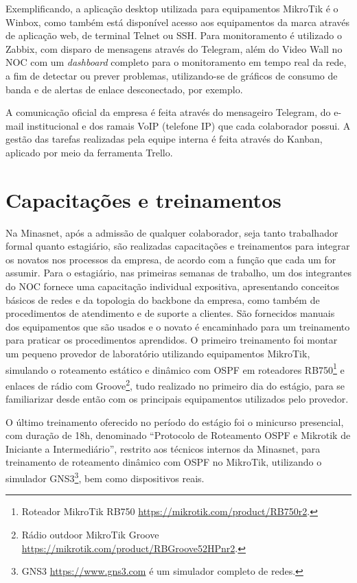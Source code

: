     Exemplificando, a aplicação desktop utilizada para equipamentos MikroTik é o Winbox, como também está disponível acesso aos equipamentos da marca através de aplicação web, de terminal Telnet ou SSH. Para monitoramento é utilizado o Zabbix, com disparo de mensagens através do Telegram, além do Video Wall no NOC com um \textit{dashboard} completo para o monitoramento em tempo real da rede, a fim de detectar ou prever problemas, utilizando-se de gráficos de consumo de banda e de alertas de enlace desconectado, por exemplo.

    A comunicação oficial da empresa é feita através do mensageiro Telegram, do e-mail institucional e dos ramais VoIP (telefone IP) que cada colaborador possui. A gestão das tarefas realizadas pela equipe interna é feita através do Kanban, aplicado por meio da ferramenta Trello.

\section{Capacitações e treinamentos}

    Na Minasnet, após a admissão de qualquer colaborador, seja tanto trabalhador formal quanto estagiário, são realizadas capacitações e treinamentos para integrar os novatos nos processos da empresa, de acordo com a função que cada um for assumir. Para o estagiário, nas primeiras semanas de trabalho, um dos integrantes do NOC fornece uma capacitação individual expositiva, apresentando conceitos básicos de redes e da topologia do backbone da empresa, como também de procedimentos de atendimento e de suporte a clientes. São fornecidos manuais dos equipamentos que são usados e o novato é encaminhado para um treinamento para praticar os procedimentos aprendidos. O primeiro treinamento foi montar um pequeno provedor de laboratório utilizando equipamentos MikroTik, simulando o roteamento estático e dinâmico com OSPF em roteadores RB750\footnote{Roteador MikroTik RB750 \url{https://mikrotik.com/product/RB750r2}.} e enlaces de rádio com Groove\footnote{Rádio outdoor MikroTik Groove \url{https://mikrotik.com/product/RBGroove52HPnr2}.}, tudo realizado no primeiro dia do estágio, para se familiarizar desde então com os principais equipamentos utilizados pelo provedor. 
    
    O último treinamento oferecido no período do estágio foi o minicurso presencial, com duração de 18h, denominado ``Protocolo de Roteamento OSPF e Mikrotik de Iniciante a Intermediário'', restrito aos técnicos internos da Minasnet, para treinamento de roteamento dinâmico com OSPF no MikroTik, utilizando o simulador GNS3\footnote{GNS3 \url{https://www.gns3.com} é um simulador completo de redes.}, bem como dispositivos reais.

